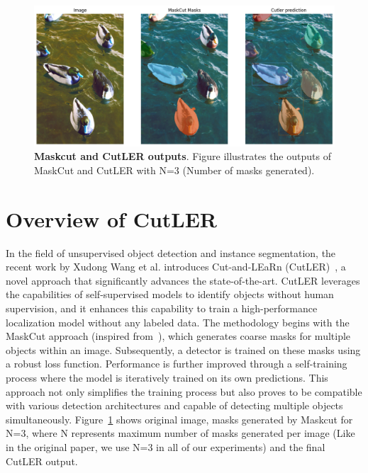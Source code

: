 %
\begin{figure}
	\centering
	\includegraphics[width=1\textwidth]{Images/main/intro_cutler_pic.png}
	\caption[\textbf{Comparison of MaskCut and CutLER Outputs}]{\textbf{Maskcut and CutLER outputs}. Figure illustrates the outputs of MaskCut and CutLER with N=3 (Number of masks generated).}
	\label{fig:mask_cut_cutler_comparison}
\end{figure}

\section{Overview of CutLER}
In the field of unsupervised object detection and instance segmentation, the recent work by Xudong Wang et al. introduces Cut-and-LEaRn (CutLER)~\cite{wang2023cut}, a novel approach that significantly advances the state-of-the-art. CutLER leverages the capabilities of self-supervised models to identify objects without human supervision, and it enhances this capability to train a high-performance localization model without any labeled data. The methodology begins with the MaskCut approach (inspired from~\cite{wang2022tokencut}), which generates coarse masks for multiple objects within an image. Subsequently, a detector is trained on these masks using a robust loss function. Performance is further improved through a self-training process where the model is iteratively trained on its own predictions. This approach not only simplifies the training process but also proves to be compatible with various detection architectures and capable of detecting multiple objects simultaneously. Figure~\ref{fig:mask_cut_cutler_comparison} shows original image, masks generated by Maskcut for N=3, where N represents maximum number of masks generated per image (Like in the original paper, we use N=3 in all of our experiments) and the final CutLER output.

